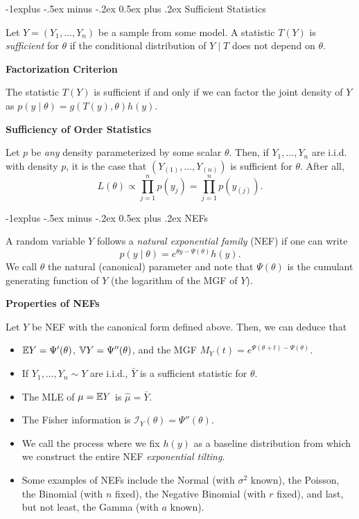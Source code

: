 \documentclass[10pt,landscape]{article}
\makeatletter
\renewcommand{\subsection}{\@startsection{subsection}{2}{0mm}%
                                {-1explus -.5ex minus -.2ex}%
                                {0.5ex plus .2ex}%
                                {\normalfont\normalsize\bfseries}}
\makeatother
\begin{document}
\begin{multicols*}{3}
\subsection{Sufficient Statistics}

Let $Y=(Y_1,\dots,Y_n)$ be a sample from some model. A statistic $T(Y)$ is \emph{sufficient} for $\theta$ if the conditional distribution of $Y\mid T$ does not depend on $\theta$.

\textbf{Factorization Criterion}

The statistic $T(Y)$ is sufficient if and only if we can factor the joint density of $Y$ as $p(y\mid \theta)=g(T(y),\theta)h(y)$.  

\textbf{Sufficiency of Order Statistics}

Let $p$ be \emph{any} density parameterized by some scalar $\theta$. Then, if $Y_1,\dots,Y_n$ are i.i.d. with density $p$, it is the case that $(Y_{(1)},\dots,Y_{(n)})$ is sufficient for $\theta$. After all, $$L(\theta)\propto \prod_{j=1}^n p(y_j)=\prod_{j=1}^n p(y_{(j)}).$$

\subsection{NEFs}

A random variable $Y$ follows a \emph{natural exponential family} (NEF) if one can write $$p(y\mid \theta)=e^{\theta y-\Psi(\theta)}h(y).$$ We call $\theta$ the natural (canonical) parameter and note that $\Psi(\theta)$ is the cumulant generating function of $Y$ (the logarithm of the MGF of $Y$).

\textbf{Properties of NEFs}

Let $Y$ be NEF with the canonical form defined above. Then, we can deduce that 
\begin{itemize}
    \item $\mathbb{E} Y=\Psi'(\theta)$, $\mathbb{V} Y=\Psi''(\theta)$, and the MGF $M_Y(t)=e^{\Psi(\theta+t)-\Psi(\theta)}$.
    \item If $Y_1,\dots,Y_n\sim Y$ are i.i.d., $\bar{Y}$ is a sufficient statistic for $\theta$.
    \item The MLE of $\mu=\mathbb{E} Y$ is $\hat{\mu}=\bar{Y}$.
    \item The Fisher information is $\mathcal{I}_Y(\theta)=\Psi''(\theta)$.
    \item We call the process where we fix $h(y)$ as a baseline distribution from which we construct the entire NEF \emph{exponential tilting}.
    \item Some examples of NEFs include the Normal (with $\sigma^2$ known), the Poisson, the Binomial (with $n$ fixed), the Negative Binomial (with $r$ fixed), and last, but not least, the Gamma (with $a$ known).
\end{itemize}


\end{multicols*}
\end{document}

